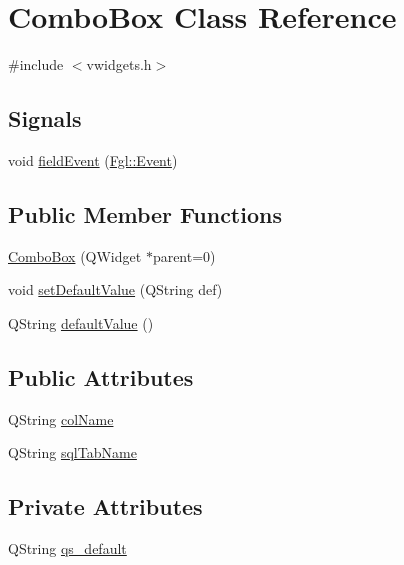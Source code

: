 \hypertarget{classComboBox}{
\section{ComboBox Class Reference}
\label{classComboBox}
}


{\ttfamily \#include $<$vwidgets.h$>$}

\subsection*{Signals}
\begin{DoxyCompactItemize}
\item 
void \hyperlink{classComboBox_a42cbdd334cab08f8cd64f4fc2a491eab}{fieldEvent} (\hyperlink{structFgl_1_1Event}{Fgl::Event})
\end{DoxyCompactItemize}
\subsection*{Public Member Functions}
\begin{DoxyCompactItemize}
\item 
\hyperlink{classComboBox_a32bb4cff0a07749af81ed8a7611a87ea}{ComboBox} (QWidget $\ast$parent=0)
\item 
void \hyperlink{classComboBox_a11c773791207b37ea0a4d68bc99d1514}{setDefaultValue} (QString def)
\item 
QString \hyperlink{classComboBox_ab48383251ec25b0144e22d2cbaf4d796}{defaultValue} ()
\end{DoxyCompactItemize}
\subsection*{Public Attributes}
\begin{DoxyCompactItemize}
\item 
QString \hyperlink{classComboBox_aba2d3d19c110bea05059e80a6125f976}{colName}
\item 
QString \hyperlink{classComboBox_a9c2352629cde1787cc7a10ea998168d1}{sqlTabName}
\end{DoxyCompactItemize}
\subsection*{Private Attributes}
\begin{DoxyCompactItemize}
\item 
QString \hyperlink{classComboBox_a945d7dffb6e4343ecbdc550f287a3c9a}{qs\_\-default}
\end{DoxyCompactItemize}


